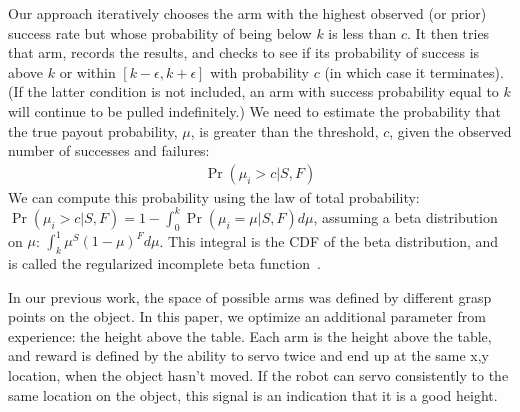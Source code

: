 \documentclass[conference,onecolumn]{IEEEtran}
\begin{document}


Our approach iteratively chooses the arm with the highest observed (or
prior) success rate but whose probability of being below $k$ is less
than $c$. It then tries that arm, records the results, and checks to
see if its probability of success is above $k$ or within $[k-\epsilon,
  k+\epsilon]$ with probability $c$ (in which case it terminates). (If
the latter condition is not included, an arm with success probability
equal to $k$ will continue to be pulled indefinitely.)  We need to
estimate the probability that the true payout probability, $\mu$, is
greater than the threshold, $c$, given the observed number of
successes and failures:
\begin{align}
\Pr(\mu_i > c|  S, F)
\end{align}
\noindent We can compute this probability using the law of total
probability: $\Pr(\mu_i > c| S, F) = 1 - \int_0^k \Pr(\mu_i=\mu | S,
F) d\mu$, assuming a beta distribution on $\mu$: $\int_k^1 \mu^S (1-
\mu) ^F d\mu$.  This integral is the CDF of the beta distribution, and
is called the regularized incomplete beta function~\citep{olver10}.

In our previous work, the space of possible arms was defined by
different grasp points on the object.  In this paper, we optimize an
additional parameter from experience: the height above the table.
Each arm is the height above the table, and reward is defined by the
ability to servo twice and end up at the same x,y location, when the
object hasn't moved.  If the robot can servo consistently to the same
location on the object, this signal is an indication that it is a good
height.
\end{document}
